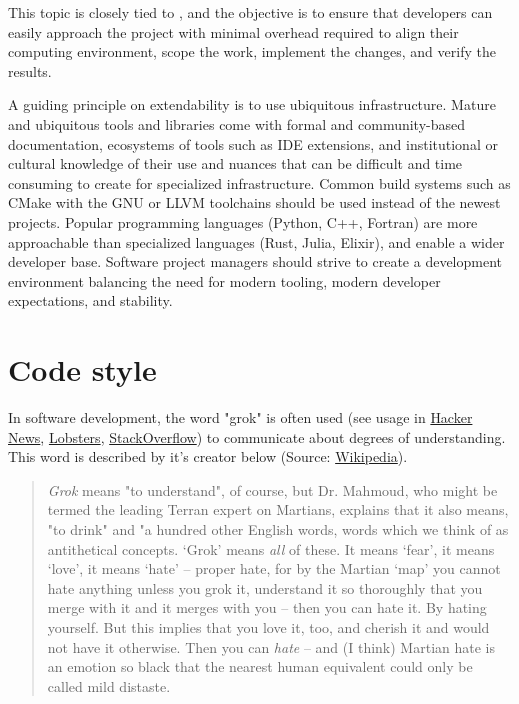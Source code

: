 \documentclass[]{nrel}
\begin{document}
This topic is closely tied to , and the objective is to ensure that
developers can easily approach the project with minimal overhead required to align their
computing environment, scope the work, implement the changes, and verify the results.

A guiding principle on extendability is to use ubiquitous infrastructure.
Mature and ubiquitous tools and libraries come with formal and community-based documentation,
ecosystems of tools such as IDE extensions, and institutional or cultural knowledge of
their use and nuances that can be difficult and time consuming to create for specialized
infrastructure.
Common build systems such as CMake with the GNU or LLVM toolchains should be used instead of
the newest projects.
Popular programming languages (Python, C++, Fortran) are more approachable than specialized
languages (Rust, Julia, Elixir), and enable a wider developer base.
Software project managers should strive to create a development environment balancing the need for
modern tooling, modern developer expectations, and stability.

\section{Code style}
In software development, the word "grok" is often used (see usage in
\href{https://hn.algolia.com/?q=grok}{Hacker News},
\href{https://lobste.rs/search?q=grok\&what=stories\&order=newest}{Lobsters},
\href{https://stackoverflow.com/search?tab=newest\&q=grok\&searchOn=3}{StackOverflow})
to communicate about degrees of understanding. This word is described by it’s creator below
(Source: \href{https://en.wikipedia.org/wiki/Grok}{Wikipedia}).
\begin{quote}

\textit{Grok} means "to understand", of course, but Dr. Mahmoud, who might be termed the leading
Terran expert on Martians, explains that it also means, "to drink" and "a hundred other
English words, words which we think of as antithetical concepts. ‘Grok’ means \textit{all} of
these. It means ‘fear’, it means ‘love’, it means ‘hate’ – proper hate, for by the Martian
‘map’ you cannot hate anything unless you grok it, understand it so thoroughly that you
merge with it and it merges with you – then you can hate it. By hating yourself. But this
implies that you love it, too, and cherish it and would not have it otherwise. Then you
can \textit{hate} – and (I think) Martian hate is an emotion so black that the nearest human
equivalent could only be called mild distaste.
\end{quote}
\end{document}
